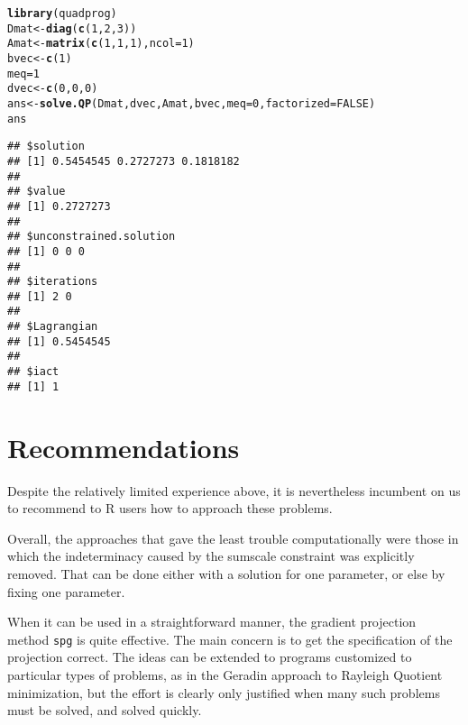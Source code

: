 \documentclass[11pt]{article}\usepackage[]{graphicx}\usepackage[]{color}
\makeatletter
\newcommand{\hlnum}[1]{\textcolor[rgb]{0.686,0.059,0.569}{#1}}%
\newcommand{\hlstd}[1]{\textcolor[rgb]{0.345,0.345,0.345}{#1}}%
\newcommand{\hlkwb}[1]{\textcolor[rgb]{0.69,0.353,0.396}{#1}}%
\newcommand{\hlkwc}[1]{\textcolor[rgb]{0.333,0.667,0.333}{#1}}%
\newcommand{\hlkwd}[1]{\textcolor[rgb]{0.737,0.353,0.396}{\textbf{#1}}}%
\newenvironment{kframe}{%
 \def\at@end@of@kframe{}%
 \ifinner\ifhmode%
  \def\at@end@of@kframe{\end{minipage}}%
  \begin{minipage}{\columnwidth}%
 \fi\fi%
 \def\FrameCommand##1{\hskip\@totalleftmargin \hskip-\fboxsep
 \colorbox{shadecolor}{##1}\hskip-\fboxsep
     \hskip-\linewidth \hskip-\@totalleftmargin \hskip\columnwidth}%
 \MakeFramed {\advance\hsize-\width
   \@totalleftmargin\z@ \linewidth\hsize
   \@setminipage}}%
 {\par\unskip\endMakeFramed%
 \at@end@of@kframe}
\newenvironment{knitrout}{}{} %
\newcommand{\R}{{\sf R }}
\newcommand{\code}[1]{{\tt#1}}
\makeatother
\begin{document}
\begin{knitrout}\scriptsize
{}\color{fgcolor}\begin{kframe}
\begin{alltt}
\hlkwd{library}\hlstd{(quadprog)}
\hlstd{Dmat}\hlkwb{<-}\hlkwd{diag}\hlstd{(}\hlkwd{c}\hlstd{(}\hlnum{1}\hlstd{,}\hlnum{2}\hlstd{,}\hlnum{3}\hlstd{))}
\hlstd{Amat}\hlkwb{<-}\hlkwd{matrix}\hlstd{(}\hlkwd{c}\hlstd{(}\hlnum{1}\hlstd{,} \hlnum{1}\hlstd{,} \hlnum{1}\hlstd{),} \hlkwc{ncol}\hlstd{=}\hlnum{1}\hlstd{)}
\hlstd{bvec}\hlkwb{<-}\hlkwd{c}\hlstd{(}\hlnum{1}\hlstd{)}
\hlstd{meq}\hlkwb{=}\hlnum{1}
\hlstd{dvec}\hlkwb{<-}\hlkwd{c}\hlstd{(}\hlnum{0}\hlstd{,} \hlnum{0}\hlstd{,} \hlnum{0}\hlstd{)}
\hlstd{ans}\hlkwb{<-}\hlkwd{solve.QP}\hlstd{(Dmat, dvec, Amat, bvec,} \hlkwc{meq}\hlstd{=}\hlnum{0}\hlstd{,} \hlkwc{factorized}\hlstd{=}\hlnum{FALSE}\hlstd{)}
\hlstd{ans}
\end{alltt}
\begin{verbatim}
## $solution
## [1] 0.5454545 0.2727273 0.1818182
## 
## $value
## [1] 0.2727273
## 
## $unconstrained.solution
## [1] 0 0 0
## 
## $iterations
## [1] 2 0
## 
## $Lagrangian
## [1] 0.5454545
## 
## $iact
## [1] 1
\end{verbatim}
\end{kframe}
\end{knitrout}

\section{Recommendations}

Despite the relatively limited experience above, it is nevertheless incumbent on us to 
recommend to \R  users how to approach these problems. 

Overall, the approaches that gave the least trouble computationally were those in 
which the indeterminacy caused by the sumscale constraint was explicitly removed.
That can be done either with a solution for one parameter, or else by fixing one
parameter. 

When it can be used in a straightforward manner, the gradient projection method
\code{spg} is quite effective. The main concern is to get the specification of
the projection correct. The ideas can be extended to programs customized to 
particular types of problems, as in the Geradin approach to Rayleigh Quotient
minimization, but the effort is clearly only justified when many such problems
must be solved, and solved quickly.
\end{document}
